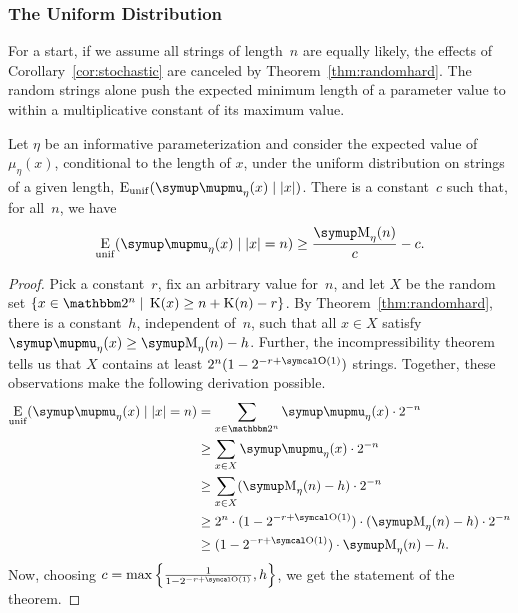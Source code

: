 \subsubsection{The Uniform Distribution}
For a start, if we assume all strings of length~$n$ are equally likely, the effects of Corollary~\ref{cor:stochastic} are canceled by Theorem~\ref{thm:randomhard}.
The random strings alone push the expected minimum length of a parameter value to within a multiplicative constant of its maximum value.
\begin{theorem}
\label{thm:expected_uniform}%
  Let $\eta$ be an informative parameterization and consider the expected value of $\mu_\eta(x)$, conditional to the length of $x$, under the uniform distribution on strings of a given length, $\Ex_\mathrm{unif}(\mu_\eta(x) \given \length{x})$.
  There is a constant~$c$ such that, for all~$n$, we have
  \begin{equation*}
    \Ex_\mathrm{unif}(\mu_\eta(x) \given \length{x} = n) \ge \frac{\upM_\eta(n)}{c} - c.
  \end{equation*}
\end{theorem}
\begin{proof}
  Pick a constant~$r$, fix an arbitrary value for~$n$, and let $X$ be the random set $\{x \in \binary^n \st \KC(x) \ge n + \KC(n) - r\}$.
  By Theorem~\ref{thm:randomhard}, there is a constant~$h$, independent of~$n$, such that all $x \in X$ satisfy $\mu_\eta(x) \ge \upM_\eta(n) - h$.
  Further, the incompressibility theorem~\parencite{li2008introduction} tells us that $X$ contains at least $2^n(1 - 2^{-r + \bigO(1)})$ strings.
  Together, these observations make the following derivation possible.
  \begin{align*}
    \Ex_\mathrm{unif}(\mu_\eta(x) \given \length{x} = n) &= \sum_{x \in \binary^n} \mu_\eta(x) \cdot 2^{-n} \\
      &\ge \sum_{x \in X} \mu_\eta(x) \cdot 2^{-n} \\
      &\ge \sum_{x \in X} (\upM_\eta(n) - h) \cdot 2^{-n} \\
      &\ge 2^n \cdot (1 - 2^{-r + \bigO(1)}) \cdot (\upM_\eta(n) - h) \cdot 2^{-n} \\
      &\ge (1 - 2^{-r + \bigO(1)}) \cdot \upM_\eta(n) - h.
  \end{align*}
  Now, choosing $c = \max\left\{\frac{1}{1 - 2^{-r + \bigO(1)}}, h\right\}$, we get the statement of the theorem.
\end{proof}

